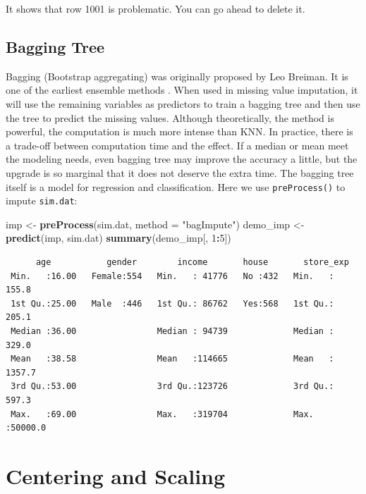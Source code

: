 \documentclass[12pt,]{krantz}
\makeatletter
\newenvironment{Shaded}{\begin{snugshade}}{\end{snugshade}}
\newcommand{\DataTypeTok}[1]{\textcolor[rgb]{0.27,0.27,0.27}{#1}}
\newcommand{\DecValTok}[1]{\textcolor[rgb]{0.06,0.06,0.06}{#1}}
\newcommand{\KeywordTok}[1]{\textcolor[rgb]{0.27,0.27,0.27}{\textbf{#1}}}
\newcommand{\NormalTok}[1]{#1}
\newcommand{\OperatorTok}[1]{\textcolor[rgb]{0.43,0.43,0.43}{\textbf{#1}}}
\newcommand{\StringTok}[1]{\textcolor[rgb]{0.5,0.5,0.5}{#1}}
\newenvironment{kframe}{%
\medskip{}
\setlength{\fboxsep}{.8em}
 \def\at@end@of@kframe{}%
 \ifinner\ifhmode%
  \def\at@end@of@kframe{\end{minipage}}%
  \begin{minipage}{\columnwidth}%
 \fi\fi%
 \def\FrameCommand##1{\hskip\@totalleftmargin \hskip-\fboxsep
 \colorbox{shadecolor}{##1}\hskip-\fboxsep
     \hskip-\linewidth \hskip-\@totalleftmargin \hskip\columnwidth}%
 \MakeFramed {\advance\hsize-\width
   \@totalleftmargin\z@ \linewidth\hsize
   \@setminipage}}%
 {\par\unskip\endMakeFramed%
 \at@end@of@kframe}
\renewenvironment{Shaded}{\begin{kframe}}{\end{kframe}}
\makeatother
\begin{document}
It shows that row 1001 is problematic. You can go ahead to delete it.

\hypertarget{bagging-tree}{%
\subsection{Bagging Tree}\label{bagging-tree}}

Bagging (Bootstrap aggregating) was originally proposed by Leo Breiman. It is one of the earliest ensemble methods \citep{bag1}. When used in missing value imputation, it will use the remaining variables as predictors to train a bagging tree and then use the tree to predict the missing values. Although theoretically, the method is powerful, the computation is much more intense than KNN. In practice, there is a trade-off between computation time and the effect. If a median or mean meet the modeling needs, even bagging tree may improve the accuracy a little, but the upgrade is so marginal that it does not deserve the extra time. The bagging tree itself is a model for regression and classification. Here we use \texttt{preProcess()} to impute \texttt{sim.dat}:

\begin{Shaded}
\begin{Highlighting}[]
\NormalTok{imp <-}\StringTok{ }\KeywordTok{preProcess}\NormalTok{(sim.dat, }\DataTypeTok{method =} \StringTok{"bagImpute"}\NormalTok{)}
\NormalTok{demo_imp <-}\StringTok{ }\KeywordTok{predict}\NormalTok{(imp, sim.dat)}
\KeywordTok{summary}\NormalTok{(demo_imp[, }\DecValTok{1}\OperatorTok{:}\DecValTok{5}\NormalTok{])}
\end{Highlighting}
\end{Shaded}

\begin{verbatim}
      age           gender        income       house       store_exp      
 Min.   :16.00   Female:554   Min.   : 41776   No :432   Min.   :  155.8  
 1st Qu.:25.00   Male  :446   1st Qu.: 86762   Yes:568   1st Qu.:  205.1  
 Median :36.00                Median : 94739             Median :  329.0  
 Mean   :38.58                Mean   :114665             Mean   : 1357.7  
 3rd Qu.:53.00                3rd Qu.:123726             3rd Qu.:  597.3  
 Max.   :69.00                Max.   :319704             Max.   :50000.0  
\end{verbatim}

\hypertarget{centering-and-scaling}{%
\section{Centering and Scaling}\label{centering-and-scaling}}
\end{document}
